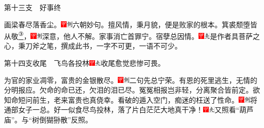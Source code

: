 第十三支　好事终

画梁春尽落香尘。{\includegraphics[width=3mm]{../Images/00002}\includegraphics[width=3mm]{../Images/00011}\footnotesize \kaishu 六朝妙句。}擅风情，秉月貌，便是败家的根本。箕裘颓堕皆从敬\href{../Text/part0009_split_000.html\#lnkback_3_a}{\textsuperscript{③}}，{\includegraphics[width=3mm]{../Images/00002}\includegraphics[width=3mm]{../Images/00011}\footnotesize \kaishu 深意，他人不解。}家事消亡首罪宁。宿孽总因情。{\includegraphics[width=3mm]{../Images/00002}\includegraphics[width=3mm]{../Images/00012}\footnotesize \kaishu 是作者具菩萨之心，秉刀斧之笔，撰成此书，一字不可更，一语不可少。}

第十四支{收尾}　飞鸟各投林{\includegraphics[width=3mm]{../Images/00002}\includegraphics[width=3mm]{../Images/00012}\footnotesize \kaishu 收尾愈觉悲惨可畏。}

为官的家业凋零，富贵的金银散尽。{\includegraphics[width=3mm]{../Images/00002}\includegraphics[width=3mm]{../Images/00011}\footnotesize \kaishu 二句先总宁荣。}有恩的死里逃生，无情的分明报应。欠命的命已还，欠泪的泪已尽。冤冤相报岂非轻，分离聚合皆前定。欲知命短问前生，老来富贵也真侥幸。看破的遁入空门，痴迷的枉送了性命。{\includegraphics[width=3mm]{../Images/00002}\includegraphics[width=3mm]{../Images/00011}\footnotesize \kaishu 将通部女子一总。}好一似食尽鸟投林，落了片白茫茫大地真干净！{\includegraphics[width=3mm]{../Images/00002}\includegraphics[width=3mm]{../Images/00012}\footnotesize \kaishu 又照看``葫芦庙''。与``树倒猢狲散''反照。}

